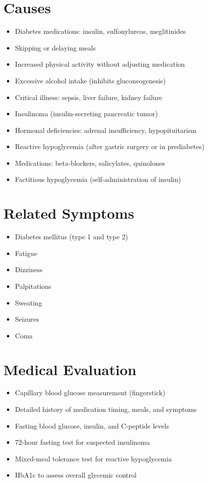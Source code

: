 \section*{Causes}
\begin{itemize}
\item Diabetes medications: insulin, sulfonylureas, meglitinides
\item Skipping or delaying meals
\item Increased physical activity without adjusting medication
\item Excessive alcohol intake (inhibits gluconeogenesis)
\item Critical illness: sepsis, liver failure, kidney failure
\item Insulinoma (insulin-secreting pancreatic tumor)
\item Hormonal deficiencies: adrenal insufficiency, hypopituitarism
\item Reactive hypoglycemia (after gastric surgery or in prediabetes)
\item Medications: beta-blockers, salicylates, quinolones
\item Factitious hypoglycemia (self-administration of insulin)
\end{itemize}

\section*{Related Symptoms}
\begin{itemize}
\item Diabetes mellitus (type 1 and type 2)
\item Fatigue
\item Dizziness
\item Palpitations
\item Sweating
\item Seizures
\item Coma
\end{itemize}

\section*{Medical Evaluation}
\begin{itemize}
\item Capillary blood glucose measurement (fingerstick)
\item Detailed history of medication timing, meals, and symptoms
\item Fasting blood glucose, insulin, and C-peptide levels
\item 72-hour fasting test for suspected insulinoma
\item Mixed-meal tolerance test for reactive hypoglycemia
\item HbA1c to assess overall glycemic control
\end{itemize}

